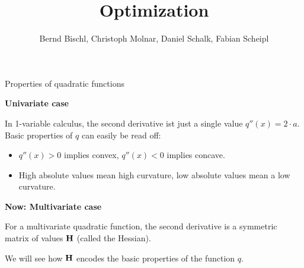 




\newcommand{\titlefigure}{figure_man/hinge_vs_l2.pdf}
\newcommand{\learninggoals}{
\item Properites of Quadratic functions
\item }


\title{Optimization}
\author{Bernd Bischl, Christoph Molnar, Daniel Schalk, Fabian Scheipl}
\date{}



\sloppy


\begin{vbframe}{Properties of quadratic functions}

  \textbf{Univariate case} \vspace*{0.2cm}
  
  In 1-variable calculus, the second derivative ist just a single value $q''(x) = 2 \cdot a$. Basic properties of $q$ can easily be read off: 
  
  \begin{itemize}
    \item $q''(x) > 0$ implies convex, $q''(x) < 0$  implies concave.
    \item High absolute values mean high curvature, low absolute values mean a low curvature. 
  \end{itemize}
  
  \vspace*{0.2cm}
  
  \textbf{Now: Multivariate case}\vspace*{0.2cm}
  
  For a multivariate quadratic function, the second derivative is a symmetric matrix of values $\bf{H}$ (called the Hessian). 
  
  \lz 
  
  We will see how $\bf{H}$ encodes the basic properties of the function $q$. 
  
  \end{vbframe}
  
